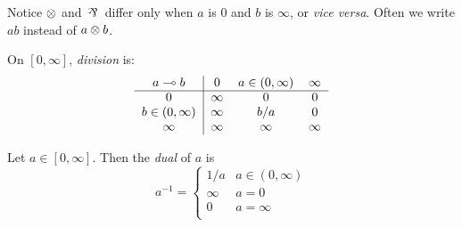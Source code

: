 Notice $\otimes{}$ and $\dismul{}$ differ only when $a$ is $0$ and $b$ is $\infty$, or \textit{vice versa}. Often we write $ab$ instead of $a \otimes{} b$.

\begin{definition}[Division]
\label{Division}
    On $[0,\infty]$, \emph{division} is:
    \begin{equation*}
		\begin{tabular}{c|ccc}
			$a \ediv{} b$ & $0$ & $a \in (0,\infty)$ & $\infty$\\
			\cline{1-4}
			$0$ 			   & $\infty$ & $0$ 		& $0$\\
			$b \in (0,\infty)$ & $\infty$ & $b/a$		& $0$\\
			$\infty$ 		   & $\infty$ & $\infty$ & $\infty$
		\end{tabular}
	\end{equation*}
\end{definition}

\begin{definition}
\label{dual}
    Let $a \in [0,\infty]$. Then the \emph{dual} of $a$ is
    \[  a^{-1} =
    \begin{cases}
    1/a  & a \in (0,\infty)  \\
    \infty & a = 0 \\
    0 & a = \infty \\
   \end{cases}
    \]
\end{definition}